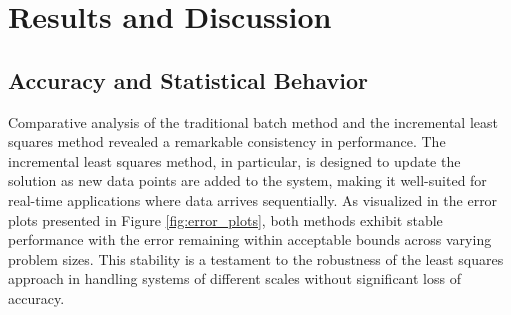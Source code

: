 \documentclass{article}
\begin{document}
\section{Results and Discussion}

\subsection{Accuracy and Statistical Behavior}
Comparative analysis of the traditional batch method and the incremental least squares method revealed a remarkable consistency in performance. The incremental least squares method, in particular, is designed to update the solution as new data points are added to the system, making it well-suited for real-time applications where data arrives sequentially. As visualized in the error plots presented in Figure \ref{fig:error_plots}, both methods exhibit stable performance with the error remaining within acceptable bounds across varying problem sizes. This stability is a testament to the robustness of the least squares approach in handling systems of different scales without significant loss of accuracy.
\end{document}
